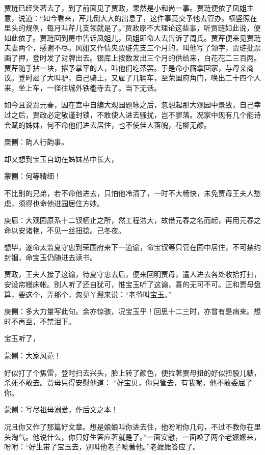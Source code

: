 \begin{parag}
    贾琏已经笑著去了，到了前面见了贾政，果然是小和尚一事。贾琏便依了凤姐主意，说道：“如今看来，芹儿倒大大的出息了，这件事竟交予他去管办。横竖照在里头的规例，每月叫芹儿支领就是了。”贾政原不大理论这些事，听贾琏如此说，便如此依了。贾琏回到房中告诉凤姐儿，凤姐即命人去告诉了周氏。贾芹便来见贾琏夫妻两个，感谢不尽。风姐又作情央贾琏先支三个月的，叫他写了领字，贾琏批票画了押，登时发了对牌出去。银库上按数发出三个月的供给来，白花花二三百两。贾芹随手拈一块，撂予掌平的人，叫他们吃茶罢。于是命小厮拿回家，与母亲商议。登时雇了大叫驴，自己骑上，又雇了几辆车，至荣国府角门，唤出二十四个人来，坐上车，一径往城外铁槛寺去了。当下无话。
\end{parag}


\begin{parag}
    如今且说贾元春，因在宫中自编大观园题咏之后，忽想起那大观园中景致，自己幸过之后，贾政必定敬谨封锁，不敢使人进去骚扰，岂不寥落。况家中现有几个能诗会赋的姊妹，何不命他们进去居住，也不使佳人落魄，花柳无颜。\begin{note}庚侧：韵人行韵事。\end{note}却又想到宝玉自幼在姊妹丛中长大，\begin{note}蒙侧：何等精细！\end{note}不比别的兄弟，若不命他进去，只怕他冷清了，一时不大畅快，未免贾母王夫人愁虑，须得也命他进园居住方妙。\begin{note}庚眉：大观园原系十二钗栖止之所，然工程浩大，故借元春之名而起，再用元春之命以安诸艳，不见一丝扭捻。己冬夜。\end{note}想毕，遂命太监夏守忠到荣国府来下一道谕，命宝钗等只管在园中居住，不可禁约封锢，命宝玉仍随进去读书。
\end{parag}


\begin{parag}
    贾政，王夫人接了这谕，待夏守忠去后，便来回明贾母，遣人进去各处收拾打扫，安设帘幔床帐。别人听了还自犹可，惟宝玉听了这谕，喜的无可不可。正和贾母盘算，要这个，弄那个，忽见丫鬟来说：“老爷叫宝玉。”\begin{note}庚侧：多大力量写此句。余亦惊骇，况宝玉乎！回思十二三时，亦曾有是病来。想时不再至，不禁泪下。\end{note}宝玉听了，\begin{note}蒙侧：大家风范！\end{note}好似打了个焦雷，登时扫去兴头，脸上转了颜色，便拉著贾母扭的好似扭股儿糖，杀死不敢去。贾母只得安慰他道： “好宝贝，你只管去，有我呢，他不敢委屈了你。\begin{note}蒙侧：写尽祖母溺爱，作后文之本！\end{note}况且你又作了那篇好文章。想是娘娘叫你进去住，他吩咐你几句，不过不教你在里头淘气。他说什么，你只好生答应著就是了。”一面安慰，一面唤了两个老嬷嬷来，吩咐：“好生带了宝玉去，别叫他老子唬著他。”老嬷嬷答应了。
\end{parag}


